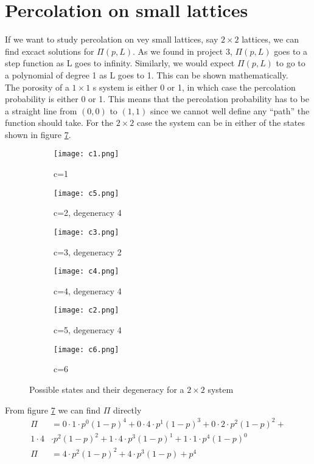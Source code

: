\documentclass[a4paper,english, 10pt, twoside]{article}
\begin{document}
\section{Percolation on small lattices}
If we want to study percolation on vey small lattices, say $2\times2$ lattices, we can find excact solutions for $\Pi(p,L)$. As we found 
in project 3, $\Pi(p,L)$ goes to a step function as L goes to infinity. Similarly, we would expect $\Pi(p,L)$ to go to a polynomial of 
degree 1 as L goes to 1. This can be shown mathematically.\\
The porosity of a $1\times1$ s system is either 0 or 1, in which case the percolation probability is either 0 or 1. This means that the 
percolation probability has to be a straight line from $(0,0)$ to $(1,1)$ since we cannot well define any ``path'' the function should take.
For the $2\times2$ case the system can be in either of the states shown in figure \ref{L2}.

\begin{figure}[H]
\centering
  \begin{subfigure}[b]{0.3\textwidth}
    \texttt{[image: c1.png]}
    \caption{c=1}
    \label{L2:c1}
  \end{subfigure}
  \begin{subfigure}[b]{0.3\textwidth}
    \texttt{[image: c5.png]}
    \caption{c=2, degeneracy 4}
    \label{L2:c2}
  \end{subfigure}
  \begin{subfigure}[b]{0.3\textwidth}
    \texttt{[image: c3.png]}
    \caption{c=3, degeneracy 2}
    \label{L2:c3}
  \end{subfigure}
  
  \begin{subfigure}[b]{0.3\textwidth}
   \texttt{[image: c4.png]}
   \caption{c=4, degeneracy 4}
   \label{L2:c4}
  \end{subfigure}
  \begin{subfigure}[b]{0.3\textwidth}
   \texttt{[image: c2.png]}
   \caption{c=5, degeneracy 4}
   \label{L2:c5}
  \end{subfigure}
    \begin{subfigure}[b]{0.3\textwidth}
    \texttt{[image: c6.png]}
    \caption{c=6}
    \label{L2:c6}
  \end{subfigure}
  \caption{Possible states and their degeneracy for a $2\times2$ system}
  \label{L2}
\end{figure}
From figure \ref{L2} we can find $\Pi$ directly
\begin{align*}
 \Pi &= 0\cdot1\cdot p^0(1-p)^4 + 0\cdot4\cdot p^1(1-p)^3 + 0\cdot2\cdot p^2(1-p)^2 +\\
 1\cdot4&\cdot p^2(1-p)^2 + 1\cdot4\cdot p^3(1-p)^1 + 1\cdot1\cdot p^4(1-p)^0 \\
 \Pi &=4\cdot p^2(1-p)^2 + 4\cdot p^3(1-p) + p^4
\end{align*}
\end{document}
